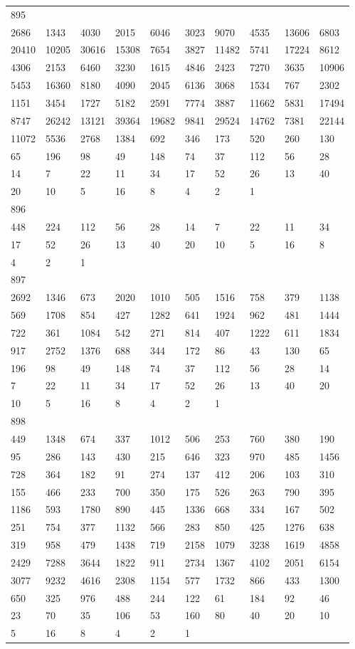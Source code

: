 \begin{longtable}{*{10}{l}}
895&&&&&&&&&\\
2686& 1343& 4030& 2015& 6046& 3023& 9070& 4535& 13606& 6803\\
20410& 10205& 30616& 15308& 7654& 3827& 11482& 5741& 17224& 8612\\
4306& 2153& 6460& 3230& 1615& 4846& 2423& 7270& 3635& 10906\\
5453& 16360& 8180& 4090& 2045& 6136& 3068& 1534& 767& 2302\\
1151& 3454& 1727& 5182& 2591& 7774& 3887& 11662& 5831& 17494\\
8747& 26242& 13121& 39364& 19682& 9841& 29524& 14762& 7381& 22144\\
11072& 5536& 2768& 1384& 692& 346& 173& 520& 260& 130\\
65& 196& 98& 49& 148& 74& 37& 112& 56& 28\\
14& 7& 22& 11& 34& 17& 52& 26& 13& 40\\
20& 10& 5& 16& 8& 4& 2& 1& \\

896&&&&&&&&&\\
448& 224& 112& 56& 28& 14& 7& 22& 11& 34\\
17& 52& 26& 13& 40& 20& 10& 5& 16& 8\\
4& 2& 1& \\

897&&&&&&&&&\\
2692& 1346& 673& 2020& 1010& 505& 1516& 758& 379& 1138\\
569& 1708& 854& 427& 1282& 641& 1924& 962& 481& 1444\\
722& 361& 1084& 542& 271& 814& 407& 1222& 611& 1834\\
917& 2752& 1376& 688& 344& 172& 86& 43& 130& 65\\
196& 98& 49& 148& 74& 37& 112& 56& 28& 14\\
7& 22& 11& 34& 17& 52& 26& 13& 40& 20\\
10& 5& 16& 8& 4& 2& 1& \\

898&&&&&&&&&\\
449& 1348& 674& 337& 1012& 506& 253& 760& 380& 190\\
95& 286& 143& 430& 215& 646& 323& 970& 485& 1456\\
728& 364& 182& 91& 274& 137& 412& 206& 103& 310\\
155& 466& 233& 700& 350& 175& 526& 263& 790& 395\\
1186& 593& 1780& 890& 445& 1336& 668& 334& 167& 502\\
251& 754& 377& 1132& 566& 283& 850& 425& 1276& 638\\
319& 958& 479& 1438& 719& 2158& 1079& 3238& 1619& 4858\\
2429& 7288& 3644& 1822& 911& 2734& 1367& 4102& 2051& 6154\\
3077& 9232& 4616& 2308& 1154& 577& 1732& 866& 433& 1300\\
650& 325& 976& 488& 244& 122& 61& 184& 92& 46\\
23& 70& 35& 106& 53& 160& 80& 40& 20& 10\\
5& 16& 8& 4& 2& 1& \\


\end{longtable}
